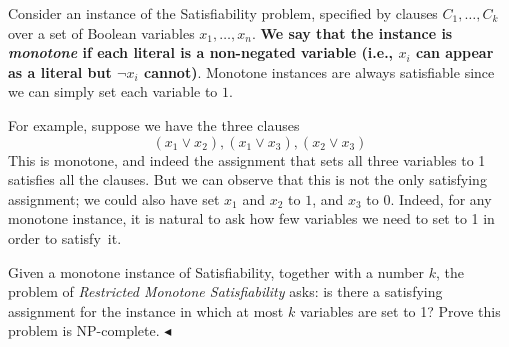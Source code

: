 \documentclass[11pt]{article}
\newenvironment{problem}[2][Problem]{\begin{trivlist}
    \item[\hskip \labelsep{\bfseries#1}\hskip\labelsep{\bfseries#2.}]\mbox{}\newline}{\hfill$\blacktriangleleft$\end{trivlist}}
\begin{document}
\begin{problem}{3. (Restricted Monotone Satisfiability)}
    Consider an instance of the Satisfiability problem, specified by clauses $C_1, \ldots, C_k$ over a set of Boolean variables $x_1, \ldots, x_n$. \textbf{We say that the instance is \textit{monotone} if each literal is a non-negated variable (i.e., $x_i$ can appear as a literal but $\neg x_i$ cannot)}. Monotone instances are always satisfiable since we can simply set each variable to $1$.

For example, suppose we have the three clauses
$$
\left(x_{1} \vee x_{2}\right),\left(x_{1} \vee x_{3}\right),\left(x_{2} \vee x_{3}\right)
$$
This is monotone, and indeed the assignment that sets all three variables to 1 satisfies all the clauses. But we can observe that this is not the only satisfying assignment; we could also have set $x_{1}$ and $x_{2}$ to $1$, and $x_{3}$ to $0$. Indeed, for any monotone instance, it is natural to ask how few variables we need to set to 1 in order to satisfy~it.

Given a monotone instance of Satisfiability, together with a number $k$, the problem of \textit{Restricted Monotone Satisfiability} asks: is there a satisfying assignment for the instance in which at most $k$ variables are set to 1? Prove this problem is NP-complete.
\end{problem}
\end{document}
